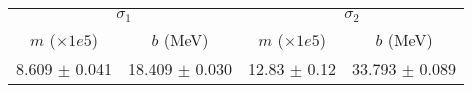 \begin{tabular}{cc|cc}
\multicolumn{2}{c|}{$\sigma_1$} & \multicolumn{2}{|c}{$\sigma_2$} \\
$m$ ($\times1e5$) & $b$ (MeV) & $m$ ($\times1e5$) & $b$ (MeV) \\
\hline
8.609 $\pm$ 0.041 & 18.409 $\pm$ 0.030 & 12.83 $\pm$ 0.12 & 33.793 $\pm$ 0.089\\
\end{tabular}
